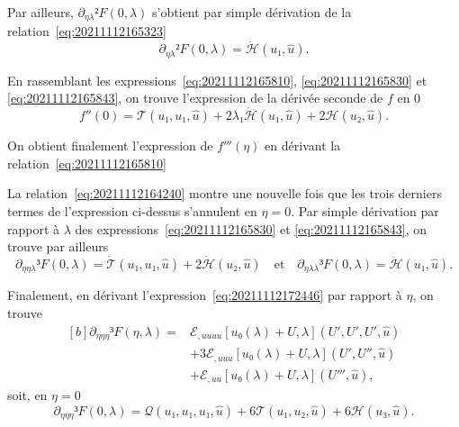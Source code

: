\documentclass[12pt, final]{amsart}
\begin{document}
Par ailleurs, \(\partial_{η\lambda}²F(0, \lambda)\) s'obtient par simple
dérivation de la relation~\eqref{eq:20211112165323}
\begin{equation}
  \label{eq:20211112165843}
  \partial_{η\lambda}²F(0, \lambda)=\dot{\mathcal H}(u₁, \hat{u}).
\end{equation}

En rassemblant les expressions~\eqref{eq:20211112165810},
\eqref{eq:20211112165830} et \eqref{eq:20211112165843}, on trouve l'expression
de la dérivée seconde de \(f\) en 0
\begin{equation}
  \label{eq:20211112182333}
  f''(0)=\mathcal T(u₁, u₁, \hat{u})
  +2\lambda₁\dot{\mathcal H}(u₁, \hat{u})
  +2\mathcal H(u₂, \hat{u}).
\end{equation}

On obtient finalement l'expression de \(f'''(η)\) en dérivant la
relation~\eqref{eq:20211112165810}

La relation~\eqref{eq:20211112164240} montre une nouvelle fois que les trois
derniers termes de l'expression ci-dessus s'annulent en \(η=0\). Par simple
dérivation par rapport à \(\lambda\) des expressions~\eqref{eq:20211112165830}
et \eqref{eq:20211112165843}, on trouve par ailleurs
\begin{equation}
  \label{eq:20211112173247}
  \partial_{ηη\lambda}³F(0, \lambda)
  =\dot{\mathcal T}(u₁, u₁, \hat{u})+2\dot{\mathcal H}(u₂, \hat{u})
  \quad\text{et}\quad
  \partial_{η\lambda\lambda}³F(0, \lambda)
  =\ddot{\mathcal H}(u₁, \hat{u}).
\end{equation}

Finalement, en dérivant l'expression~\eqref{eq:20211112172446} par rapport à
\(η\), on trouve
\begin{equation}
  \begin{aligned}[b]
    \partial_{ηηη}³F(η, \lambda)={}&
    ℰ_{,uuuu}[u₀(\lambda)+U, \lambda](U', U', U', \hat{u})\\
    &+3ℰ_{,uuu}[u₀(\lambda)+U, \lambda](U', U'', \hat{u})\\
    &+ℰ_{,uu}[u₀(\lambda)+U, \lambda](U''', \hat{u}),
  \end{aligned}
\end{equation}
soit, en \(η=0\)
\begin{equation}
  \label{eq:20211112173300}
  \partial_{ηηη}³F(0, \lambda)=
  \mathcal Q(u₁, u₁, u₁, \hat{u})
  +6\mathcal T(u₁, u₂, \hat{u})
  +6\mathcal H(u₃, \hat{u}).
\end{equation}
\end{document}
